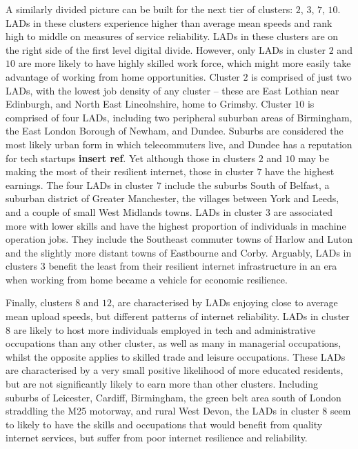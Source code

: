 \documentclass[Royal,times,sageh]{sagej}
\begin{document}
A similarly divided picture can be built for the next tier of clusters:
\(2\), \(3\), \(7\), \(10\). LADs in these clusters experience higher
than average mean speeds and rank high to middle on measures of service
reliability. LADs in these clusters are on the right side of the first
level digital divide. However, only LADs in cluster \(2\) and \(10\) are
more likely to have highly skilled work force, which might more easily
take advantage of working from home opportunities. Cluster \(2\) is
comprised of just two LADs, with the lowest job density of any cluster
-- these are East Lothian near Edinburgh, and North East Lincolnshire,
home to Grimsby. Cluster \(10\) is comprised of four LADs, including two
peripheral suburban areas of Birmingham, the East London Borough of
Newham, and Dundee. Suburbs are considered the most likely urban form in
which telecommuters live, and Dundee has a reputation for tech startups
\textbf{insert ref}. Yet although those in clusters \(2\) and \(10\) may
be making the most of their resilient internet, those in cluster \(7\)
have the highest earnings. The four LADs in cluster \(7\) include the
suburbs South of Belfast, a suburban district of Greater Manchester, the
villages between York and Leeds, and a couple of small West Midlands
towns. LADs in cluster \(3\) are associated more with lower skills and
have the highest proportion of individuals in machine operation jobs.
They include the Southeast commuter towns of Harlow and Luton and the
slightly more distant towns of Eastbourne and Corby. Arguably, LADs in
clusters \(3\) benefit the least from their resilient internet
infrastructure in an era when working from home became a vehicle for
economic resilience.

Finally, clusters \(8\) and \(12\), are characterised by LADs enjoying
close to average mean upload speeds, but different patterns of internet
reliability. LADs in cluster \(8\) are likely to host more individuals
employed in tech and administrative occupations than any other cluster,
as well as many in managerial occupations, whilst the opposite applies
to skilled trade and leisure occupations. These LADs are characterised
by a very small positive likelihood of more educated residents, but are
not significantly likely to earn more than other clusters. Including
suburbs of Leicester, Cardiff, Birmingham, the green belt area south of
London straddling the M25 motorway, and rural West Devon, the LADs in
cluster \(8\) seem to likely to have the skills and occupations that
would benefit from quality internet services, but suffer from poor
internet resilience and reliability.
\end{document}
